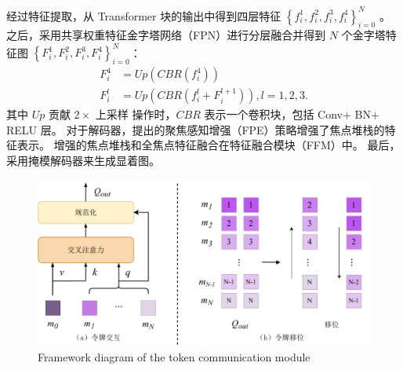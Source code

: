 经过特征提取，从 Transformer 块的输出中得到四层特征 
$\left \{ f_{i}^{1},f_{i}^{2},f_{i}^{3},f_{i}^{4} \right \}_{i=0}^{N}$ 。 
之后，采用共享权重特征金字塔网络（FPN）进行分层融合并得到 $N$ 个金字塔特征图	$ \left \{F_{i}^{1},F_{i}^{2},F_{i}^{3},F_{i}^{4} \right \}_{i=0}^{N}$：
\begin{equation}
	\begin{aligned}
		F_{i}^{4} &= Up \left ( CBR \left ( f_{i}^{4} \right )\right ) \\ 
		F_{i}^{l} &= Up \left ( CBR \left ( f_{i}^{l} + F_{i}^{l+1} \right )  \right ),l=1,2,3  .
	\end{aligned}
\end{equation}
其中 $Up$ 贡献 $2 \times $ 上采样 操作时，$CBR$ 表示一个卷积块，包括 Conv+ BN+ RELU 层。 对于解码器，提出的聚焦感知增强（FPE）策略增强了焦点堆栈的特征表示。 增强的焦点堆栈和全焦点特征融合在特征融合模块（FFM）中。 最后，采用掩模解码器来生成显着图。




















\begin{figure}[b]
	\centering
	\includegraphics[width=0.95\linewidth]{figures/chapter3/token-interaction.drawio}
	{Framework diagram of the token communication module}
	\label{cpt3_fig1:token_interaction}
\end{figure}



